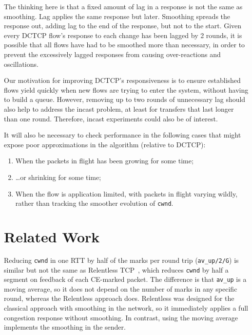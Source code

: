 The thinking here is that a fixed amount of lag in a response is not the same as
smoothing. Lag applies the same response but later. Smoothing spreads the
response out, adding lag to the end of the response, but not to the start. Given
every DCTCP flow's response to each change has been lagged by 2 rounds, it is
possible that all flows have had to be smoothed more than necessary, in order to
prevent the excessively lagged responses from causing over-reactions and
oscillations.

Our motivation for improving DCTCP's responsiveness is to ensure established
flows yield quickly when new flows are trying to enter the system, without
having to build a queue. However, removing up to two rounds of unnecessary lag
should also help to address the incast problem, at least for transfers that last
longer than one round. Therefore, incast experiments could also be of interest.

It will also be necessary to check performance in the following cases that might
expose poor approximations in the algorithm (relative to DCTCP):
\begin{enumerate}
	\item When the packets in flight has been growing for some time;
	\item \ldots{}or shrinking for some time;
	\item When the flow is application limited, with packets in flight varying
	wildly, rather than tracking the smoother evolution of \texttt{cwnd}.
\end{enumerate}


\section{Related Work}\label{prresp_related}
\balance
Reducing \texttt{cwnd} in one RTT by half of the marks per round trip
(\texttt{av\_up/2/G}) is similar but not the same as Relentless
TCP~\cite{Mathis09:Relentless}, which reduces \texttt{cwnd} by half a segment on
feedback of each CE-marked packet. The difference is that \texttt{av\_up} is a
moving average, so it does not depend on the number of marks in any specific
round, whereas the Relentless approach does. Relentless was designed for the
classical approach with smoothing in the network, so it immediately applies a
full congestion response without smoothing. In contrast, using the moving
average implements the smoothing in the sender.


